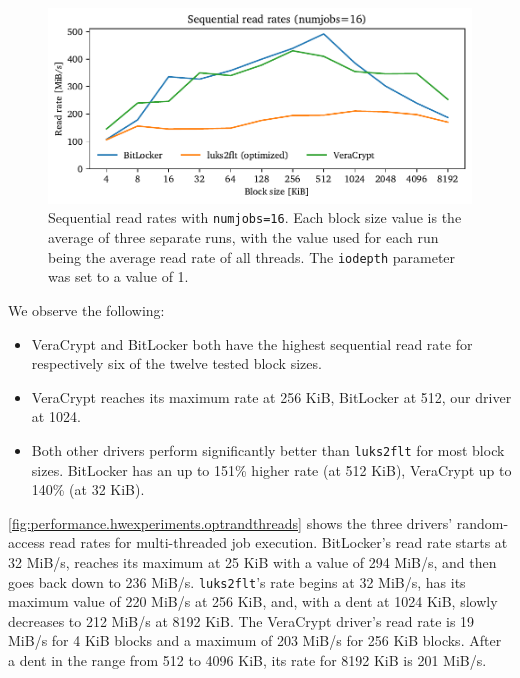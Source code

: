 \begin{figure}[htb!]
	\center
	\includegraphics[scale=1]{../fig/performance.hwexperiments.optseqthreads.pdf}
	\caption[
		Sequential read rates with \texttt{numjobs=16}
	]{
		Sequential read rates with \texttt{numjobs=16}. Each block size value is the average of three separate runs, with the value used for each run being the average read rate of all threads. The \texttt{iodepth} parameter was set to a value of 1.
	}
	\label{fig:performance.hwexperiments.optseqthreads}
\end{figure}

We observe the following:
\begin{itemize}[beginpenalty=10000]
	\item VeraCrypt and BitLocker both have the highest sequential read rate for respectively six of the twelve tested block sizes.
	\item VeraCrypt reaches its maximum rate at 256 KiB, BitLocker at 512, our driver at 1024.
	\item Both other drivers perform significantly better than \texttt{luks2flt} for most block sizes. BitLocker has an up to 151\% higher rate (at 512 KiB), VeraCrypt up to 140\% (at 32 KiB).
\end{itemize}

\autoref{fig:performance.hwexperiments.optrandthreads} shows the three drivers' random-access read rates for multi-threaded job execution. BitLocker's read rate starts at 32 MiB/s, reaches its maximum at 25 KiB with a value of 294 MiB/s, and then goes back down to 236 MiB/s. \texttt{luks2flt}'s rate begins at 32 MiB/s, has its maximum value of 220 MiB/s at 256 KiB, and, with a dent at 1024 KiB, slowly decreases to 212 MiB/s at 8192 KiB. The VeraCrypt driver's read rate is 19 MiB/s for 4 KiB blocks and a maximum of 203 MiB/s for 256 KiB blocks. After a dent in the range from 512 to 4096 KiB, its rate for 8192 KiB is 201 MiB/s.

